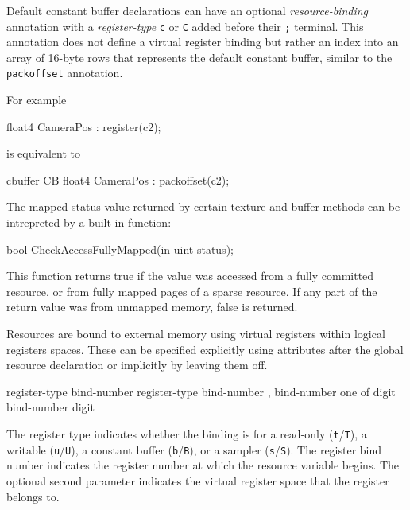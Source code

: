 \p Default constant buffer declarations can have an optional
\textit{resource-binding} annotation with a \textit{register-type} \texttt{c} or
\texttt{C} added before their \texttt{;} terminal. This annotation does not
define a virtual register binding but rather an index into an array of 16-byte
rows that represents the default constant buffer, similar to the
\texttt{packoffset} annotation.

\p For example
\begin{HLSL}
  float4 CameraPos : register(c2);
\end{HLSL}

is equivalent to

\begin{HLSL}
  cbuffer CB {
    float4 CameraPos : packoffset(c2);
  }
\end{HLSL}



The mapped status value returned by certain texture and buffer methods can be
intrepreted by a built-in function:

\begin{HLSL}
  bool CheckAccessFullyMapped(in uint status);
\end{HLSL}

This function returns true if the value was accessed from a fully committed
resource, or from fully mapped pages of a sparse resource. If any part of the
return value was from unmapped memory, false is returned.


Resources are bound to external memory using virtual registers within logical registers spaces.
These can be specified explicitly using attributes after the global resource declaration
or implicitly by leaving them off.

\begin{grammar}
  \br
   register-type bind-number \terminal{)}\br
   register-type bind-number ,  bind-number \terminal{)}\br
   \textnormal{one of}\br
  \br
  \br
  digit\br
  bind-number digit\br
\end{grammar}

The register type indicates whether the binding is for a read-only
(\texttt{t}/\texttt{T}), a writable (\texttt{u}/\texttt{U}), a constant buffer
(\texttt{b}/\texttt{B}), or a sampler (\texttt{s}/\texttt{S}). The register bind
number indicates the register number at which the resource variable begins. The
optional second parameter indicates the virtual register space that the register
belongs to.

